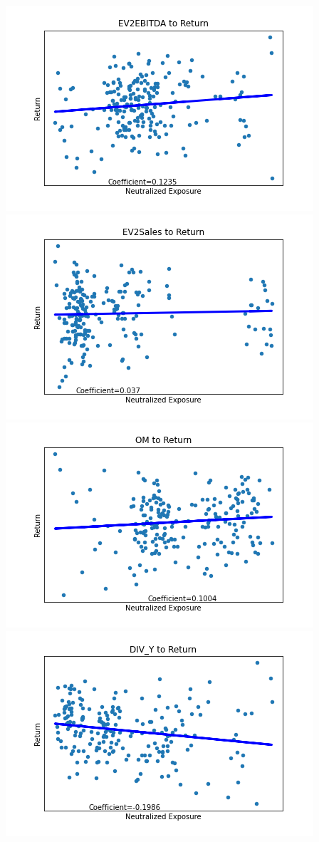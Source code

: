 \documentclass{article}
\begin{document}
\begin{center}
\includegraphics[scale=0.5]{rEV2EBITDA.png}
\includegraphics[scale=0.5]{rEV2Sales.png}\\
\includegraphics[scale=0.5]{rOM.png}
\includegraphics[scale=0.5]{rDIV_Y.png}\\

\end{center}
\end{document}
